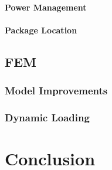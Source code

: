 \documentclass[twoside,11pt]{report}
\begin{document}
			\subsubsection{Power Management}
			\subsubsection{Package Location}
	\section{FEM}
		\subsection{Model Improvements}
		\subsection{Dynamic Loading}
\chapter{Conclusion}
	
\end{document}

